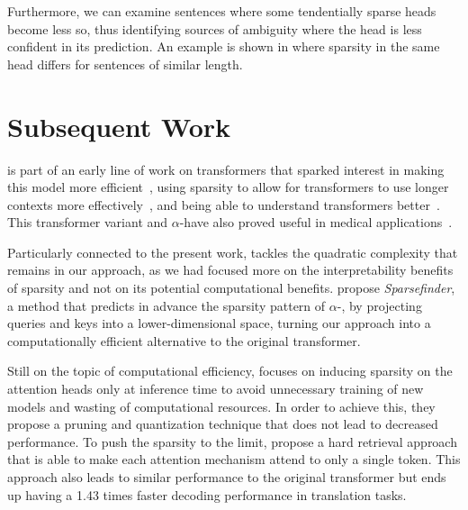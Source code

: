 Furthermore, we can examine sentences where some tendentially sparse
heads become less so, thus identifying sources of ambiguity where the
head is less confident in its prediction. An example is shown in
 where sparsity in the same head differs
for sentences of similar length.

\section{Subsequent Work}\label{sec:subsequent_work_adapt}

\noindent \citet{correia2019adaptively} is part of an early line of work
on transformers that sparked interest in making this model more
efficient~\citep[\textit{inter
        alia}]{daras2020SMYRFEfficientAttention,
    li2020SACAcceleratingStructuring, merrill2021EffectsParameterNorm,
    roy2021EfficientContentBasedSparse}, using sparsity to allow for
transformers to use longer contexts more
effectively~\citep[\textit{inter alia}]{jiang2020LongDocumentRanking,
    qiu2020BlockwiseSelfAttentionLong, sukhbaatar2021NotAllMemories}, and
being able to understand transformers better~\citep[\textit{inter
        alia}]{you2020HardCodedGaussianAttention,
    rogers2020PrimerBERTologyWhat, pande2021headshypothesisunifying}.
This transformer variant and $\alpha$-\entmaxtext have also proved
useful in medical applications~\citep{guo2020LearningLatentForests,
    yun2021SpecTrSpectralTransformer}.

Particularly connected to the present work,
\citet{treviso2021PredictingAttentionSparsity} tackles the quadratic
complexity that remains in our approach, as we had focused more on
the interpretability benefits of sparsity and not on its potential
computational benefits.
\citet{treviso2021PredictingAttentionSparsity} propose
\emph{Sparsefinder}, a method that predicts in advance the sparsity
pattern of $\alpha$-\entmaxtext, by projecting queries and keys into
a lower-dimensional space, turning our approach into a
computationally efficient alternative to the original transformer.

Still on the topic of computational efficiency,
\citet{ji2021DistributionSparsityInferencetime} focuses on inducing
sparsity on the attention heads only at inference time to avoid
unnecessary training of new models and wasting of computational
resources. In order to achieve this, they propose a pruning and
quantization technique that does not lead to decreased performance.
To push the sparsity to the limit,
\citet{xu2021LearningHardRetrieval} propose a hard retrieval approach
that is able to make each attention mechanism attend to only a single
token. This approach also leads to similar performance to the
original transformer but ends up having a 1.43 times faster decoding
performance in translation tasks.

